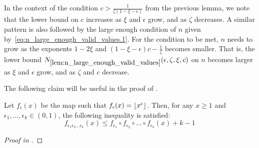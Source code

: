         \begin{remark} \label{rmk:n_grows}
            In the context of the condition $c > \frac{1}{\zeta (1 - \xi - \epsilon)}$ from the previous lemma, we note that
            the lower bound on $c$ increases as $\xi$ and $\epsilon$ grow, and as $\zeta$ decreases.
            A similar pattern is also followed by the large enough condition of $n$ given
            by~\eqref{eq:n_large_enough_valid_values.1}.
            For the condition to be met, $n$ needs to grow as the exponents $1-2\xi$ and
            $(1 - \xi - \epsilon)c - \frac{1}{\zeta}$ becomes smaller.
            That is, the lower bound $N_{\ref{lem:n_large_enough_valid_values}}(\epsilon, \zeta, \xi, c)$ on $n$ becomes larger as $\xi$ and $\epsilon$ grow, and as $\zeta$ and $c$ decrease.
        \end{remark}

        The following claim will be useful in the proof of .
        \begin{claim} \label{clm:floor_exponential_composition_bound}
            Let $f_\epsilon(x)$ be the map such that $f_\epsilon(x) = \left\lfloor x^\epsilon \right\rfloor$.
            Then, for any $x \geq 1$ and $\epsilon_1, \dots, \epsilon_k \in (0,1)$, the following
            inequality is satisfied:
            \[
                f_{\epsilon_1 \epsilon_2 \dots \epsilon_k}(x)
                    \leq f_{\epsilon_1} \circ f_{\epsilon_2} \circ \dots \circ f_{\epsilon_k}(x) + k - 1
            \]
            \begin{proof}[Proof in ]
            \end{proof}
        \end{claim}

